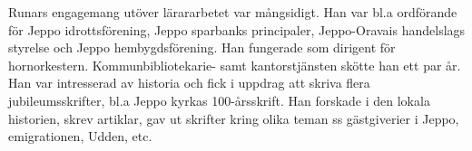 Runars engagemang utöver lärararbetet var mångsidigt. Han var bl.a ordförande för  Jeppo idrottsförening, Jeppo sparbanks principaler, Jeppo-Oravais handelslags styrelse och Jeppo hembygdsförening. Han fungerade som dirigent för hornorkestern. Kommunbibliotekarie- samt kantorstjänsten skötte han ett par år. Han var intresserad av historia och fick i uppdrag att skriva flera jubileumsskrifter, bl.a Jeppo kyrkas 100-årsskrift. Han forskade i den lokala historien, skrev artiklar, gav ut skrifter kring olika teman ss gästgiverier i Jeppo, emigrationen, Udden, etc.
